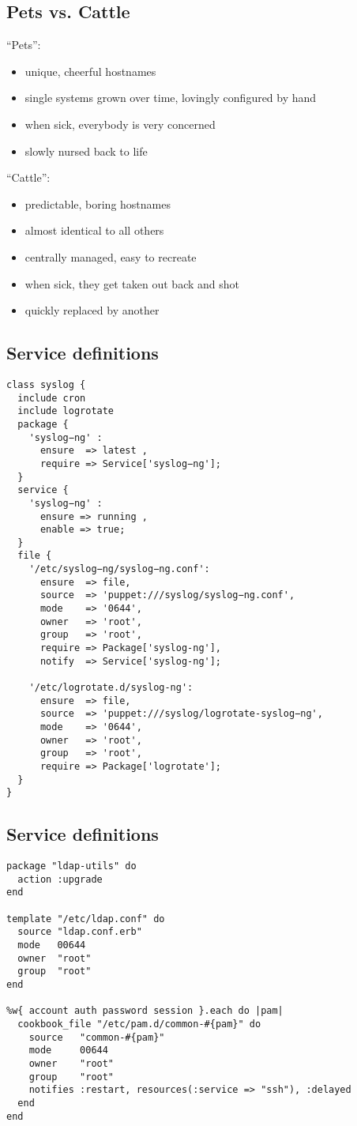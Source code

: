 \documentclass[xga]{xdvislides}
\begin{document}
\subsection{Pets vs. Cattle}
``Pets'':
\begin{itemize}
	\item unique, cheerful hostnames
	\item single systems grown over time, lovingly configured by hand
	\item when sick, everybody is very concerned
	\item slowly nursed back to life
\end{itemize}
\vspace{.25in}
``Cattle'':
\begin{itemize}
	\item predictable, boring hostnames
	\item almost identical to all others
	\item centrally managed, easy to recreate
	\item when sick, they get taken out back and shot
	\item quickly replaced by another
\end{itemize}

\subsection{Service definitions}
\small
\begin{verbatim}
class syslog {
  include cron
  include logrotate
  package {
    'syslog−ng' :
      ensure  => latest ,
      require => Service['syslog−ng'];
  }
  service {
    'syslog−ng' :
      ensure => running ,
      enable => true;
  }
  file {
    '/etc/syslog−ng/syslog−ng.conf':
      ensure  => file,
      source  => 'puppet:///syslog/syslog−ng.conf',
      mode    => '0644',
      owner   => 'root',
      group   => 'root',
      require => Package['syslog-ng'],
      notify  => Service['syslog-ng'];

    '/etc/logrotate.d/syslog-ng':
      ensure  => file,
      source  => 'puppet:///syslog/logrotate-syslog−ng',
      mode    => '0644',
      owner   => 'root',
      group   => 'root',
      require => Package['logrotate'];
  }
}
\end{verbatim}
\Normalsize

\subsection{Service definitions}
\smallish
\begin{verbatim}
package "ldap-utils" do
  action :upgrade
end

template "/etc/ldap.conf" do
  source "ldap.conf.erb"
  mode   00644
  owner  "root"
  group  "root"
end

%w{ account auth password session }.each do |pam|
  cookbook_file "/etc/pam.d/common-#{pam}" do
    source   "common-#{pam}"
    mode     00644
    owner    "root"
    group    "root"
    notifies :restart, resources(:service => "ssh"), :delayed
  end
end
\end{verbatim}
\Normalsize
\end{document}
